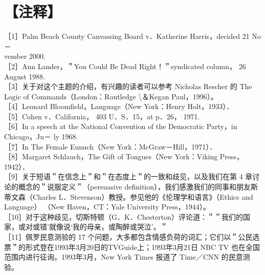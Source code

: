\section*{【注释】}
［1］Palm Beach County Canvassing Board v．Katherine Harris，decided 21 No－\\
vember 2000.\\
［2］Ann Lander，＂You Could Be Dead Right！＂syndicated column， 26 August 1988.\\
［3］关于对这个主题的介绍，有兴趣的读者可以参考 Nicholas Rescher 的 The Logic of Commands（London：Routledge \textbackslash ＆Kegan Paul，1996）。\\
［4］Leonard Bloomfield，Language（New York：Henry Holt，1933）．\\
［5］Cohen v．California， 403 U．S．15，at p．26， 1971.\\
［6］In a speech at the National Convention of the Democratic Party，in Chicago，Ju－ ly 1968.\\
［7］In The Female Eunuch（New York：McGraw－Hill，1971）．\\
［8］Margaret Schlauch，The Gift of Tongues（New York：Viking Press，1942）．\\
［9］关于短语＂在信念上＂和＂在态度上＂的一致和歧见，以及我们在第 4 章讨论的概念的＂说服定义＂（persuasive definition），我们感激我们的同事和朋友斯蒂文森（Charles L．Stevenson）教授。参见他的《伦理学和语言》（Ethics and Language） （New Haven，CT：Yale University Press，1944）。\\
［10］对于这种歧见，切斯特顿（G．K．Chesterton）评论道：＂＂我们的国家，或对或错’就像说‘我的母亲，或陶醉或哭泣’。＂\\
［11］佩罗民意测验的 17 个问题，大多都包含情感负荷的词汇；它们以＂公民选票＂的形式登在1993年3月20日的TVGuide上；1993年3月21日 NBC TV 也在全国范围内进行征询。1993年3月，New York Times 报道了 Time／CNN 的民意测验。